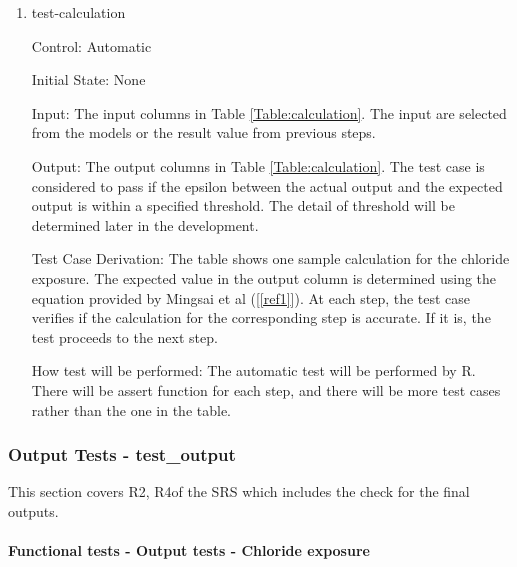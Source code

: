 \documentclass[12pt, titlepage]{article}
\newcommand{\reref}[1]{\ref{#1}}
\begin{document}
\begin{enumerate}

\item{test-calculation\\}
					
Control: Automatic 
					
Initial State: None 
					
Input: The input columns in Table \ref{Table:calculation}. The input are selected from the models or the result value from previous steps. 
					
Output: The output columns in Table \ref{Table:calculation}. The test case is considered to pass if the epsilon between the actual output and the expected output is within a specified threshold. The detail  of threshold will be determined later in the development.

Test Case Derivation: The table shows one sample calculation for the chloride exposure. The expected value in the output column is determined using the equation provided by Mingsai et al ([\reref{ref1}]). At each step, the test case verifies if the calculation for the corresponding step is accurate. If it is, the test proceeds to the next step. 
					
How test will be performed: The automatic test will be performed by R. There will be assert function for each step, and there will be more test cases rather than the one in the table. 

\end{enumerate}





\subsubsection{Output Tests - test\_output}\label{t_output}
This section covers R2, R4of the SRS which includes the check for the final outputs.

		
\paragraph{Functional tests - Output tests - Chloride exposure}
\end{document}
